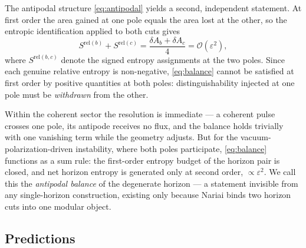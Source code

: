 \documentclass[11pt]{article}
\newcommand{\Nariai}{Nariai}
\begin{document}
The antipodal structure \eqref{eq:antipodal} yields a second, independent statement. At first order the area gained at one pole equals the area lost at the other, so the entropic identification applied to both cuts gives
\begin{equation}
S^{\mathrm{rel}(b)} + S^{\mathrm{rel}(c)}
= \frac{\delta A_b + \delta A_c}{4}
= \mathcal{O}(\varepsilon^2),
\label{eq:balance}
\end{equation}
where $S^{\mathrm{rel}(b,c)}$ denote the signed entropy assignments at the two poles. Since each genuine relative entropy is non-negative, \eqref{eq:balance} cannot be satisfied at first order by positive quantities at both poles: distinguishability injected at one pole must be \emph{withdrawn} from the other.

Within the coherent sector the resolution is immediate --- a coherent pulse crosses one pole, its antipode receives no flux, and the balance holds trivially with one vanishing term while the geometry adjusts. But for the vacuum-polarization-driven instability, where both poles participate, \eqref{eq:balance} functions as a sum rule: the first-order entropy budget of the horizon pair is closed, and net horizon entropy is generated only at second order, $\propto \varepsilon^2$. We call this the \emph{antipodal balance} of the degenerate horizon --- a statement invisible from any single-horizon construction, existing only because \Nariai{} binds two horizon cuts into one modular object.

\subsection{Predictions}
\end{document}
